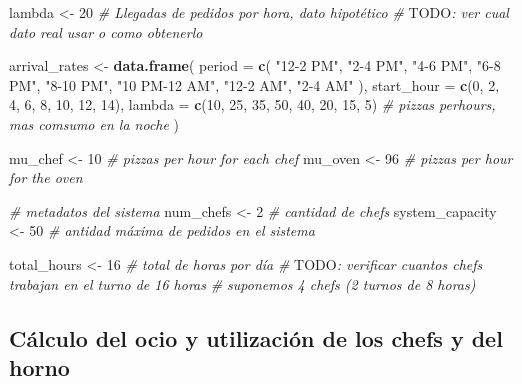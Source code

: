 \documentclass[
]{article}
\newenvironment{Shaded}{\begin{snugshade}}{\end{snugshade}}
\newcommand{\AlertTok}[1]{\textcolor[rgb]{0.94,0.16,0.16}{#1}}
\newcommand{\AttributeTok}[1]{\textcolor[rgb]{0.13,0.29,0.53}{#1}}
\newcommand{\CommentTok}[1]{\textcolor[rgb]{0.56,0.35,0.01}{\textit{#1}}}
\newcommand{\DecValTok}[1]{\textcolor[rgb]{0.00,0.00,0.81}{#1}}
\newcommand{\FunctionTok}[1]{\textcolor[rgb]{0.13,0.29,0.53}{\textbf{#1}}}
\newcommand{\NormalTok}[1]{#1}
\newcommand{\OtherTok}[1]{\textcolor[rgb]{0.56,0.35,0.01}{#1}}
\newcommand{\StringTok}[1]{\textcolor[rgb]{0.31,0.60,0.02}{#1}}
\begin{document}
\begin{Shaded}
\begin{Highlighting}[]
\NormalTok{lambda }\OtherTok{\textless{}{-}} \DecValTok{20}  \CommentTok{\# Llegadas de pedidos por hora, dato hipotético}
\CommentTok{\# }\AlertTok{TODO}\CommentTok{: ver cual dato real usar o como obtenerlo}

\NormalTok{arrival\_rates }\OtherTok{\textless{}{-}} \FunctionTok{data.frame}\NormalTok{(}
  \AttributeTok{period =} \FunctionTok{c}\NormalTok{(}
    \StringTok{"12{-}2 PM"}\NormalTok{,}
    \StringTok{"2{-}4 PM"}\NormalTok{,}
    \StringTok{"4{-}6 PM"}\NormalTok{,}
    \StringTok{"6{-}8 PM"}\NormalTok{,}
    \StringTok{"8{-}10 PM"}\NormalTok{,}
    \StringTok{"10 PM{-}12 AM"}\NormalTok{,}
    \StringTok{"12{-}2 AM"}\NormalTok{,}
    \StringTok{"2{-}4 AM"}
\NormalTok{  ),}
  \AttributeTok{start\_hour =} \FunctionTok{c}\NormalTok{(}\DecValTok{0}\NormalTok{, }\DecValTok{2}\NormalTok{, }\DecValTok{4}\NormalTok{, }\DecValTok{6}\NormalTok{, }\DecValTok{8}\NormalTok{, }\DecValTok{10}\NormalTok{, }\DecValTok{12}\NormalTok{, }\DecValTok{14}\NormalTok{),}
  \AttributeTok{lambda =} \FunctionTok{c}\NormalTok{(}\DecValTok{10}\NormalTok{, }\DecValTok{25}\NormalTok{, }\DecValTok{35}\NormalTok{, }\DecValTok{50}\NormalTok{, }\DecValTok{40}\NormalTok{, }\DecValTok{20}\NormalTok{, }\DecValTok{15}\NormalTok{, }\DecValTok{5}\NormalTok{)}
  \CommentTok{\# pizzas perhours, mas comsumo en la noche}
\NormalTok{)}

\NormalTok{mu\_chef }\OtherTok{\textless{}{-}} \DecValTok{10}   \CommentTok{\# pizzas per hour for each chef}
\NormalTok{mu\_oven }\OtherTok{\textless{}{-}} \DecValTok{96}   \CommentTok{\# pizzas per hour for the oven}

\CommentTok{\# metadatos del sistema}
\NormalTok{num\_chefs }\OtherTok{\textless{}{-}} \DecValTok{2}  \CommentTok{\# cantidad de chefs}
\NormalTok{system\_capacity }\OtherTok{\textless{}{-}} \DecValTok{50}  \CommentTok{\# antidad máxima de pedidos en el sistema}

\NormalTok{total\_hours }\OtherTok{\textless{}{-}} \DecValTok{16}  \CommentTok{\# total de horas por día}
\CommentTok{\# }\AlertTok{TODO}\CommentTok{: verificar cuantos chefs trabajan en el turno de 16 horas}
\CommentTok{\# suponemos 4 chefs (2 turnos de 8 horas)}
\end{Highlighting}
\end{Shaded}

\subsection{Cálculo del ocio y utilización de los chefs y del
horno}\label{cuxe1lculo-del-ocio-y-utilizaciuxf3n-de-los-chefs-y-del-horno}
\end{document}
